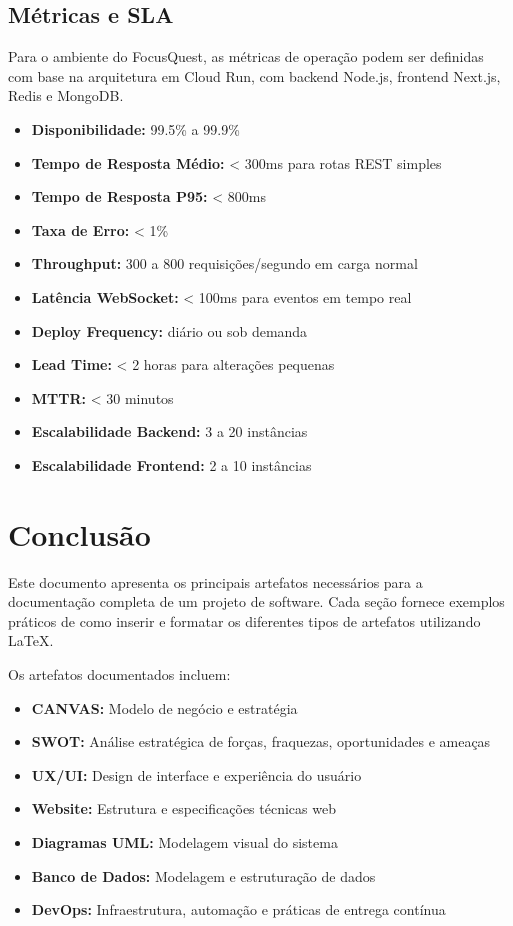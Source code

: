 \documentclass[11pt,a4paper]{article}
\begin{document}
\subsection{Métricas e SLA}

Para o ambiente do FocusQuest, as métricas de operação podem ser definidas com base na arquitetura em Cloud Run, com backend Node.js, frontend Next.js, Redis e MongoDB.

\begin{itemize}
    \item \textbf{Disponibilidade:} 99.5\% a 99.9\%
    \item \textbf{Tempo de Resposta Médio:} < 300ms para rotas REST simples
    \item \textbf{Tempo de Resposta P95:} < 800ms
    \item \textbf{Taxa de Erro:} < 1\%
    \item \textbf{Throughput:} 300 a 800 requisições/segundo em carga normal
    \item \textbf{Latência WebSocket:} < 100ms para eventos em tempo real
    \item \textbf{Deploy Frequency:} diário ou sob demanda
    \item \textbf{Lead Time:} < 2 horas para alterações pequenas
    \item \textbf{MTTR:} < 30 minutos
    \item \textbf{Escalabilidade Backend:} 3 a 20 instâncias
    \item \textbf{Escalabilidade Frontend:} 2 a 10 instâncias
\end{itemize}

\newpage
\section*{Conclusão}

Este documento apresenta os principais artefatos necessários para a documentação completa de um projeto de software. Cada seção fornece exemplos práticos de como inserir e formatar os diferentes tipos de artefatos utilizando \LaTeX.

Os artefatos documentados incluem:
\begin{itemize}
    \item \textbf{CANVAS:} Modelo de negócio e estratégia
    \item \textbf{SWOT:} Análise estratégica de forças, fraquezas, oportunidades e ameaças
    \item \textbf{UX/UI:} Design de interface e experiência do usuário
    \item \textbf{Website:} Estrutura e especificações técnicas web
    \item \textbf{Diagramas UML:} Modelagem visual do sistema
    \item \textbf{Banco de Dados:} Modelagem e estruturação de dados
    \item \textbf{DevOps:} Infraestrutura, automação e práticas de entrega contínua
\end{itemize}

\newpage
{}


\end{document}
